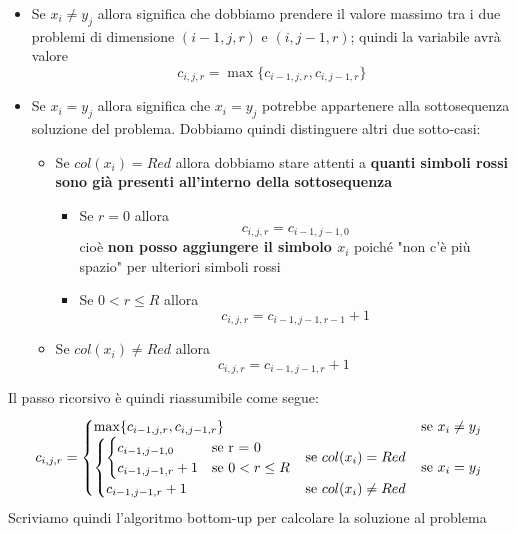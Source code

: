 \documentclass[12pt]{article}
\begin{document}
\begin{itemize}
    \item Se $x_i \neq y_j$ allora significa che dobbiamo prendere il valore massimo tra i due problemi di dimensione $(i-1, j, r)$ e $(i, j-1, r)$; quindi la variabile avrà valore
    $$c_{i, j, r} = \max\{c_{i-1, j, r}, c_{i, j-1, r}\}$$
    \item Se $x_i = y_j$ allora significa che $x_i = y_j$ potrebbe appartenere alla sottosequenza soluzione del problema. Dobbiamo quindi distinguere altri due sotto-casi:
    \begin{itemize}
        \item Se $col(x_i) = Red$ allora dobbiamo stare attenti a \textbf{quanti simboli rossi sono già presenti all'interno della sottosequenza}
        \begin{itemize}
            \item Se $r = 0$ allora $$c_{i,j,r} = c_{i-1, j-1, 0}$$
            cioè \textbf{non posso aggiungere il simbolo $x_i$} poiché "non c'è più spazio" per ulteriori simboli rossi
            \item Se $0 < r \leq R$ allora $$c_{i, j, r} = c_{i-1, j-1, r-1} + 1$$
        \end{itemize}
        \item Se $col(x_i) \neq Red$ allora
        $$c_{i,j,r} = c_{i-1, j-1, r} +1$$
    \end{itemize}
\end{itemize}
Il passo ricorsivo è quindi riassumibile come segue:
\begin{equation*}
    c_{i,j,r} = \begin{cases}
        \max\{c_{i-1, j, r}, c_{i, j-1, r}\} & \textrm{se } x_i \neq y_j \\
        \begin{cases}
            \begin{cases}
                c_{i-1, j-1, 0} & \textrm{se } $r = 0$ \\
                c_{i-1, j-1, r} + 1 & \textrm{se } 0 < r \leq R
            \end{cases} & \textrm{se } col(x_i) = Red \\
            c_{i-1, j-1, r} + 1 & \textrm{se } col(x_i) \neq Red
        \end{cases} & \textrm{se } x_i = y_j
    \end{cases}
\end{equation*}
Scriviamo quindi l'algoritmo bottom-up per calcolare la soluzione al problema \newline
\end{document}
